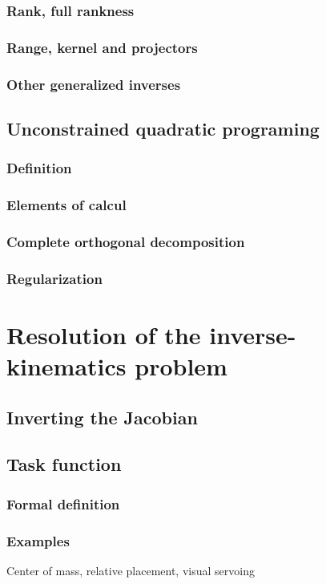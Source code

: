 \documentclass{book}
\begin{document}
\subsection{Rank, full rankness}
\subsection{Range, kernel and projectors}
\subsection{Other generalized inverses}

\section{Unconstrained quadratic programing}
\subsection{Definition}
\subsection{Elements of calcul}
\subsection{Complete orthogonal decomposition}
\subsection{Regularization}

\chapter{Resolution of the inverse-kinematics problem}

\section{Inverting the Jacobian}
\section{Task function}
\subsection{Formal definition}
\subsection{Examples}
Center of mass, relative placement, visual servoing
\end{document}
